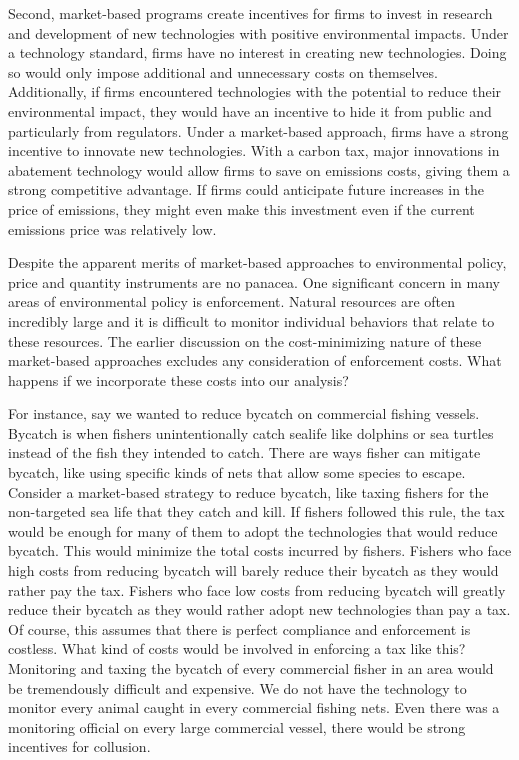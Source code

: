Second, market-based programs create incentives for firms to invest in research and development of new technologies with positive environmental impacts. Under a technology standard, firms have no interest in creating new technologies. Doing so would only impose additional and unnecessary costs on themselves. Additionally, if firms encountered technologies with the potential to reduce their environmental impact, they would have an incentive to hide it from public and particularly from regulators. Under a market-based approach, firms have a strong incentive to innovate new technologies. With a carbon tax, major innovations in abatement technology would allow firms to save on emissions costs, giving them a strong competitive advantage. If firms could anticipate future increases in the price of emissions, they might even make this investment even if the current emissions price was relatively low.
 
Despite the apparent merits of market-based approaches to environmental policy, price and quantity instruments are no panacea. One significant concern in many areas of environmental policy is enforcement. Natural resources are often incredibly large and it is difficult to monitor individual behaviors that relate to these resources. The earlier discussion on the cost-minimizing nature of these market-based approaches excludes any consideration of enforcement costs. What happens if we incorporate these costs into our analysis?

For instance, say we wanted to reduce bycatch on commercial fishing vessels. Bycatch is when fishers unintentionally catch sealife like dolphins or sea turtles instead of the fish they intended to catch. There are ways fisher can mitigate bycatch, like using specific kinds of nets that allow some species to escape.
Consider a market-based strategy to reduce bycatch, like taxing fishers for the non-targeted sea life that they catch and kill. If fishers followed this rule, the tax would be enough for many of them to adopt the technologies that would reduce bycatch. This would minimize the total costs incurred by fishers. Fishers who face high costs from reducing bycatch will barely reduce their bycatch as they would rather pay the tax. Fishers who face low costs from reducing bycatch will greatly reduce their bycatch as they would rather adopt new technologies than pay a tax. Of course, this assumes that there is perfect compliance and enforcement is costless. What kind of costs would be involved in enforcing a tax like this? Monitoring and taxing the bycatch of every commercial fisher in an area would be tremendously difficult and expensive. We do not have the technology to monitor every animal caught in every commercial fishing nets. Even there was a monitoring official on every large commercial vessel, there would be strong incentives for collusion. 

